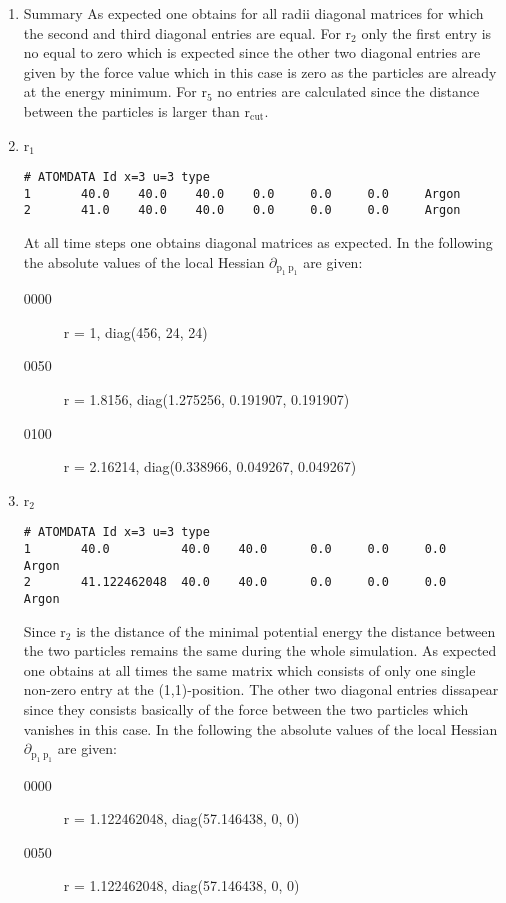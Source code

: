 \documentclass[11pt]{article}
\begin{document}
\begin{enumerate}
\item Summary
\label{sec-1-4-1-1}
As expected one obtains for all radii diagonal matrices for which the second and third diagonal entries are equal.
For r$_{\text{2}}$ only the first entry is no equal to zero which is expected since the other two diagonal entries are given by the force value which in this case is zero as the particles are already at the energy minimum.
For r$_{\text{5}}$ no entries are calculated since the distance between the particles is larger than r$_{\text{cut}}$.
\item r$_{\text{1}}$
\label{sec-1-4-1-2}
\begin{verbatim}
# ATOMDATA Id x=3 u=3 type
1       40.0    40.0    40.0    0.0     0.0     0.0     Argon
2       41.0    40.0    40.0    0.0     0.0     0.0     Argon
\end{verbatim}
At all time steps one obtains diagonal matrices as expected.
In the following the absolute values of the local Hessian $\partial$$_{\text{p}_{\text{1}} \ \text{p}_{\text{1}}}$ are given:
\begin{description}
\item[{0000}] r = 1, diag(456, 24, 24)
\item[{0050}] r = 1.8156, diag(1.275256, 0.191907, 0.191907)
\item[{0100}] r = 2.16214, diag(0.338966, 0.049267, 0.049267)
\end{description}
\item r$_{\text{2}}$
\label{sec-1-4-1-3}
\begin{verbatim}
# ATOMDATA Id x=3 u=3 type
1       40.0          40.0    40.0      0.0     0.0     0.0     Argon
2       41.122462048  40.0    40.0      0.0     0.0     0.0     Argon
\end{verbatim}
Since r$_{\text{2}}$ is the distance of the minimal potential energy the distance between the two particles remains the same during the whole simulation.
As expected one obtains at all times the same matrix which consists of only one single non-zero entry at the (1,1)-position.
The other two diagonal entries dissapear since they consists basically of the force between the two particles which vanishes in this case.
In the following the absolute values of the local Hessian $\partial$$_{\text{p}_{\text{1}} \ \text{p}_{\text{1}}}$ are given:
\begin{description}
\item[{0000}] r = 1.122462048, diag(57.146438, 0, 0)
\item[{0050}] r = 1.122462048, diag(57.146438, 0, 0)

\end{description}
\end{enumerate}
\end{document}
